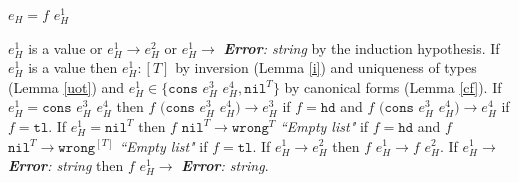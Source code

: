 \begin{case}

$e_{H}=f$ $e_{H}^{1}$

$e_{H}^{1}$ is a value or $e_{H}^{1}\rightarrow e_{H}^{2}$ or $e_{H}^{1}\rightarrow$ \emph{\textbf{Error}: string} by the induction hypothesis.  If $e_{H}^{1}$ is a value then $e_{H}^{1}:[T]$ by inversion (Lemma \ref{i}) and uniqueness of types (Lemma \ref{uot}) and $e_{H}^{1}\in\lbrace\mathtt{cons}$ $e_{H}^{3}$ $e_{H}^{4},\mathtt{nil}^{T}\rbrace$ by canonical forms (Lemma \ref{cf}).  If $e_{H}^{1}=\mathtt{cons}$ $e_{H}^{3}$ $e_{H}^{4}$ then $f$ $(\mathtt{cons}$ $e_{H}^{3}$ $e_{H}^{4})\rightarrow e_{H}^{3}$ if $f=\mathtt{hd}$ and $f$ $(\mathtt{cons}$ $e_{H}^{3}$ $e_{H}^{4})\rightarrow e_{H}^{4}$ if $f=\mathtt{tl}$.  If $e_{H}^{1}=\mathtt{nil}^{T}$ then $f$ $\mathtt{nil}^{T}\rightarrow\mathtt{wrong}^{T}$ \emph{``Empty list"} if $f=\mathtt{hd}$ and $f$ $\mathtt{nil}^{T}\rightarrow\mathtt{wrong}^{[T]}$ \emph{``Empty list"} if $f=\mathtt{tl}$.  If $e_{H}^{1}\rightarrow e_{H}^{2}$ then $f$ $e_{H}^{1}\rightarrow f$ $e_{H}^{2}$.  If $e_{H}^{1}\rightarrow$ \emph{\textbf{Error}: string} then $f$ $e_{H}^{1}\rightarrow$ \emph{\textbf{Error}: string}.

\end{case}